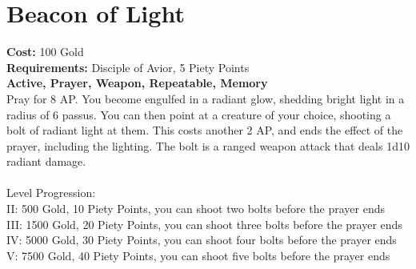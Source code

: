 \section{Beacon of Light}
\textbf{Cost:} 100 Gold\\
\textbf{Requirements:} Disciple of Avior, 5 Piety Points \\
\textbf{Active, Prayer, Weapon, Repeatable, Memory}\\
Pray for 8 AP. You become engulfed in a radiant glow, shedding bright light in a radius of 6 passus. You can then point at a creature of your choice, shooting a bolt of radiant light at them. This costs another 2 AP, and ends the effect of the prayer, including the lighting. The bolt is a ranged weapon attack that deals 1d10 radiant damage.\\
\\
Level Progression:\\
II: 500 Gold, 10 Piety Points, you can shoot two bolts before the prayer ends\\
III: 1500 Gold, 20 Piety Points, you can shoot three bolts before the prayer ends\\
IV: 5000 Gold, 30 Piety Points, you can shoot four bolts before the prayer ends\\
V: 7500 Gold, 40 Piety Points, you can shoot five bolts before the prayer ends\\